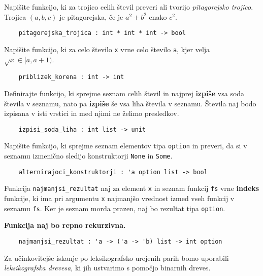 \documentclass[arhiv]{../izpit}
\begin{document}

\naloga

\podnaloga
Napišite funkcijo, ki za trojico celih števil preveri ali tvorijo \emph{pitagorejsko trojico}. Trojica $(a, b, c)$ je pitagorejska, če je $a^2 + b^2$ enako $c^2$.
\begin{verbatim}
    pitagorejska_trojica : int * int * int -> bool
\end{verbatim}

\podnaloga
Napišite funkcijo, ki za celo število \verb|x| vrne celo število \verb|a|, kjer velja $\sqrt{x} \in [a, a+1)$.
\begin{verbatim}
    priblizek_korena : int -> int
\end{verbatim}

\podnaloga
Definirajte funkcijo, ki sprejme seznam celih števil in najprej \textbf{izpiše} vsa soda števila v seznamu, nato pa \textbf{izpiše} še vsa liha števila v seznamu. Števila naj bodo izpisana v isti vrstici in med njimi ne želimo presledkov.
\begin{verbatim}
    izpisi_soda_liha : int list -> unit
\end{verbatim}

\podnaloga
Napišite funkcijo, ki sprejme seznam elementov tipa \verb|option| in preveri, da si v seznamu izmenično sledijo konstruktorji \verb|None| in 
\verb|Some|.
\begin{verbatim}
    alternirajoci_konstruktorji : 'a option list -> bool
\end{verbatim}

\podnaloga
Funkcija \verb|najmanjsi_rezultat| naj za element \verb|x| in seznam funkcij \verb|fs| vrne \textbf{indeks} funkcije, ki ima pri argumentu \verb|x| najmanjšo vrednost izmed vseh funkcij v seznamu \verb|fs|. Ker je seznam morda prazen, naj bo rezultat tipa \verb|option|.

\textbf{Funkcija naj bo repno rekurzivna.}

\begin{verbatim}
    najmanjsi_rezultat : 'a -> ('a -> 'b) list -> int option
\end{verbatim}


\naloga

Za učinkovitejše iskanje po leksikografsko urejenih parih bomo uporabili \emph{leksikografska drevesa}, ki jih ustvarimo s pomočjo binarnih dreves.
\end{document}

